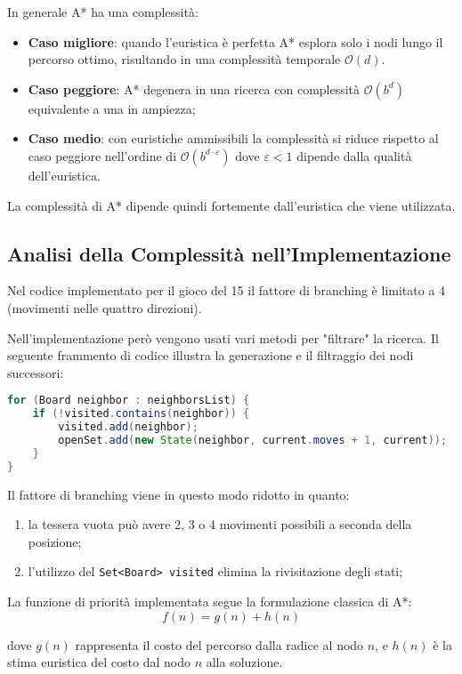 In generale A* ha una complessità: 
\begin{itemize} 
    \item \textbf{Caso migliore}: quando l'euristica è perfetta A* esplora solo i nodi lungo il percorso ottimo, risultando in una complessità temporale $\mathcal{O}(d)$.
    \item \textbf{Caso peggiore}: A* degenera in una ricerca con complessità $\mathcal{O}(b^d)$ equivalente a una in ampiezza;
    \item \textbf{Caso medio}: con euristiche ammissibili la complessità si riduce rispetto al caso peggiore nell'ordine di $\mathcal{O}(b^{d \cdot \varepsilon})$ dove $\varepsilon < 1$ dipende dalla qualità dell'euristica.
\end{itemize}

La complessità di A* dipende quindi fortemente dall'euristica che viene utilizzata. 

\subsection{Analisi della Complessità nell'Implementazione}
Nel codice implementato per il gioco del 15 il fattore di branching è limitato a 4 (movimenti nelle quattro direzioni).

Nell'implementazione però vengono usati vari metodi per "filtrare" la ricerca.
Il seguente frammento di codice illustra la generazione e il filtraggio dei nodi successori:

\begin{lstlisting}[language=Java, caption=Generazione dei nodi successori]
for (Board neighbor : neighborsList) {
    if (!visited.contains(neighbor)) {
        visited.add(neighbor);
        openSet.add(new State(neighbor, current.moves + 1, current));
    }
}
\end{lstlisting}

Il fattore di branching viene in questo modo ridotto in quanto:
\begin{enumerate}
    \item la tessera vuota può avere 2, 3 o 4 movimenti possibili a seconda della posizione;
    \item l'utilizzo del \texttt{Set<Board> visited} elimina la rivisitazione degli stati;
\end{enumerate}

La funzione di priorità implementata segue la formulazione classica di A*:
$$f(n) = g(n) + h(n)$$

dove $g(n)$ rappresenta il costo del percorso dalla radice al nodo $n$, e $h(n)$ è la stima euristica del costo dal nodo $n$ alla soluzione.

